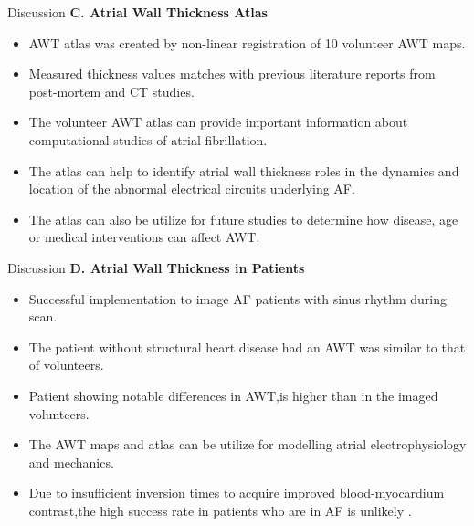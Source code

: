 \documentclass[aspectratio=43]{beamer}
\begin{document}
\newpage
\begin{frame}{Discussion}
\textbf{C. Atrial Wall Thickness Atlas}
\begin{itemize}
\item AWT atlas was created by non-linear registration of 10 volunteer AWT maps.
\item Measured thickness values matches with previous literature reports from post-mortem and CT studies.
\item The volunteer AWT atlas can provide important information about computational studies of atrial fibrillation.
\item The atlas can help to identify  atrial wall thickness roles in the dynamics and location of the abnormal electrical circuits underlying AF.
\item The atlas can also be utilize for future studies to determine how disease, age or medical interventions can affect AWT.
\end{itemize}
\end{frame}

\newpage
\begin{frame}{Discussion}
\textbf{D. Atrial Wall Thickness in Patients}
\begin{itemize}
\item Successful implementation to image AF patients with sinus rhythm during scan.
\item The patient without structural heart disease had an AWT was similar to that of volunteers.
\item Patient showing notable differences in AWT,is higher than in the imaged volunteers.
\item The AWT maps and atlas can be utilize for modelling atrial electrophysiology and mechanics.
\item Due to insufficient inversion times to acquire improved blood-myocardium contrast,the high success rate in patients who are in AF is unlikely . 
\end{itemize}
\end{frame}


\newpage
\end{document}
